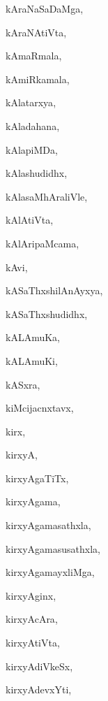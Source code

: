 \begin{multicols}{3}
{\noindent
{kAraNaSaDaMga}, \pageref{kAraNaSaDaMga}

\noindent
{kAraNAtiVta}, \pageref{kAraNAtiVta}

\noindent
{kAmaRmala}, \pageref{kAmaRmala}

\noindent
{kAmiRkamala}, \pageref{kAmiRkamala}

\noindent
{kAlatarxya}, \pageref{kAlatarxya}

\noindent
{kAladahana}, \pageref{kAladahana}

\noindent
{kAlapiMDa}, \pageref{kAlapiMDa}

\noindent
{kAlashudidhx}, \pageref{kAlashudidhx}

\noindent
{kAlasaMhAraliVle}, \pageref{kAlasaMhAraliVle}

\noindent
{kAlAtiVta}, \pageref{kAlAtiVta}

\noindent
{kAlAripaMcama}, \pageref{kAlAripaMcama}

\noindent
{kAvi}, \pageref{kAvi}

\noindent
{kASaThxshilAnAyxya}, \pageref{kASaThxshilAnAyxya}

\noindent
{kASaThxshudidhx}, \pageref{kASaThxshudidhx}

\noindent
{kALAmuKa}, \pageref{kALAmuKa}

\noindent
{kALAmuKi}, \pageref{kALAmuKi}

\noindent
{kASxra}, \pageref{kASxra}

\noindent
{kiMcijacnxtavx}, \pageref{kiMcijacnxtavx}

\noindent
{kirx}, \pageref{kirx}

\noindent
{kirxyA}, \pageref{kirxyA}

\noindent
{kirxyAgaTiTx}, \pageref{kirxyAgaTiTx}

\noindent
{kirxyAgama}, \pageref{kirxyAgama}

\noindent
{kirxyAgamasathxla}, \pageref{kirxyAgamasathxla}

\noindent
{kirxyAgamasusathxla}, \pageref{kirxyAgamasusathxla}

\noindent
{kirxyAgamayxliMga}, \pageref{kirxyAgamayxliMga}

\noindent
{kirxyAginx}, \pageref{kirxyAginx}

\noindent
{kirxyAcAra}, \pageref{kirxyAcAra}

\noindent
{kirxyAtiVta}, \pageref{kirxyAtiVta}

\noindent
{kirxyAdiVkeSx}, \pageref{kirxyAdiVkeSx}

\noindent
{kirxyAdevxYti}, \pageref{kirxyAdevxYti}

}
\end{multicols}
